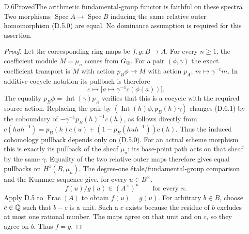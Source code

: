 \begin{statement}{D.6}{Proved}{The arithmetic fundamental-group functor is faithful on these spectra}
Two morphisms $\operatorname{Spec}A\to\operatorname{Spec}B$
inducing the same relative outer homomorphism (D.5.0) are equal.
No dominance assumption is required for this assertion.
\end{statement}
\begin{proof}
Let the corresponding ring maps be $f,g:B\to A$.  For every
$n\ge1$, the coefficient module $M=\mu_n$ comes from $G_\mathbb Q$.
For a pair $(\phi,\gamma)$ the exact coefficient transport is
$M$ with action $p_B\phi\to M$ with action $p_A$,
$m\mapsto\gamma^{-1}m$.  In additive cocycle notation its
pullback is therefore
\[
                  c\longmapsto
       \bigl[a\longmapsto\gamma^{-1}c(\phi(a))\bigr].
 \tag{D.6.1}
\]
The equality $p_B\phi=\operatorname{Int}(\gamma)p_A$ verifies
that this is a cocycle with the required source action.  Replacing
the pair by $(\operatorname{Int}(h)\phi,p_B(h)\gamma)$ changes
(D.6.1) by the coboundary of
$-\gamma^{-1}p_B(h)^{-1}c(h)$, as follows directly from
$c(huh^{-1})=p_B(h)c(u)+(1-p_B(huh^{-1}))c(h)$.
Thus the induced cohomology pullback depends only on (D.5.0).
For an actual scheme morphism this is exactly its pullback of
the sheaf $\mu_n$: its base-point path acts on that sheaf by
the same $\gamma$.  Equality of the two relative outer maps
therefore gives equal pullbacks on $H^1(B,\mu_n)$.
The degree-one \'etale/fundamental-group
comparison and the Kummer sequence give, for every $u\in B^\times$,
\[
                  f(u)/g(u)\in(A^\times)^n
                  \qquad\text{for every }n.
\]
Apply D.5 to $\operatorname{Frac}(A)$ to obtain $f(u)=g(u)$.
For arbitrary $b\in B$, choose $c\in\mathbb Q$ such that $b-c$ is a
unit.  Such a $c$ exists because the residue of $b$ excludes at
most one rational number.  The maps agree on that unit and on
$c$, so they agree on $b$.  Thus $f=g$.
\end{proof}

